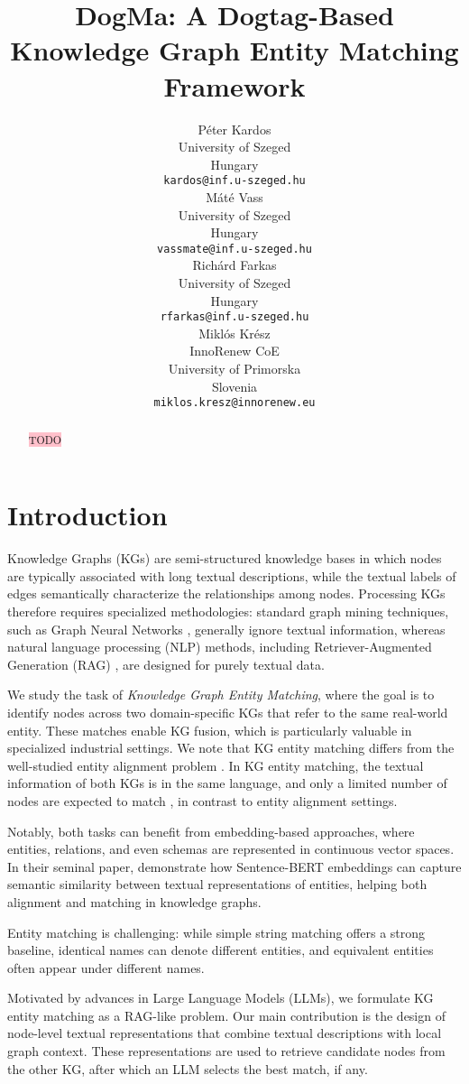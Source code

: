 \documentclass[11pt]{article}
\title{DogMa: A Dogtag-Based Knowledge Graph Entity Matching Framework}
\author{
    Péter Kardos \\
    University of Szeged \\
    Hungary \\
    \texttt{kardos@inf.u-szeged.hu} \\
    \And
    Máté Vass \\
    University of Szeged \\
    Hungary \\
    \texttt{vassmate@inf.u-szeged.hu} \\
    \AND
    Richárd Farkas \\
    University of Szeged \\
    Hungary \\
    \texttt{rfarkas@inf.u-szeged.hu} \\
    \And
    Miklós Krész \\
    InnoRenew CoE \\
    University of Primorska \\
    Slovenia \\
    \texttt{miklos.kresz@innorenew.eu} \\
}
\begin{document}
\maketitle

\begin{abstract}

\colorbox{pink}{TODO}

\end{abstract}

\section{Introduction}

Knowledge Graphs (KGs) are semi-structured knowledge bases in which nodes are typically associated with long textual descriptions, while the textual labels of edges semantically characterize the relationships among nodes. Processing KGs therefore requires specialized methodologies: standard graph mining techniques, such as Graph Neural Networks \cite{gnn_1, gnn_2}, generally ignore textual information, whereas natural language processing (NLP) methods, including Retriever-Augmented Generation (RAG) \cite{rag_survey, graphrag}, are designed for purely textual data.

We study the task of \emph{Knowledge Graph Entity Matching}, where the goal is to identify nodes across two domain-specific KGs that refer to the same real-world entity. These matches enable KG fusion, which is particularly valuable in specialized industrial settings. We note that KG entity matching differs from the well-studied entity alignment problem \cite{alignment_survey}. In KG entity matching, the textual information of both KGs is in the same language, and only a limited number of nodes are expected to match \cite{matching_survey}, in contrast to entity alignment settings.

Notably, both tasks can benefit from embedding-based approaches, where entities, relations, and even schemas are represented in continuous vector spaces. In their seminal paper, \citet{sentence_bert} demonstrate how Sentence-BERT embeddings can capture semantic similarity between textual representations of entities, helping both alignment and matching in knowledge graphs.

Entity matching is challenging: while simple string matching offers a strong baseline, identical names can denote different entities, and equivalent entities often appear under different names.

Motivated by advances in Large Language Models (LLMs), we formulate KG entity matching as a RAG-like problem. Our main contribution is the design of node-level textual representations that combine textual descriptions with local graph context. These representations are used to retrieve candidate nodes from the other KG, after which an LLM selects the best match, if any.
\end{document}
